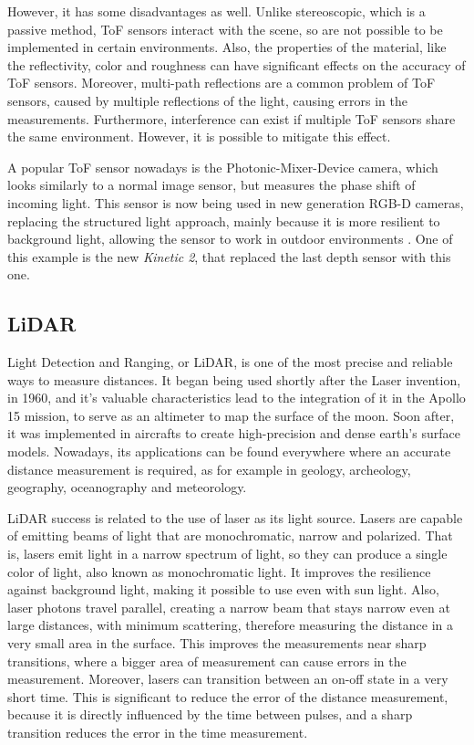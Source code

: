 However, it has some disadvantages as well. Unlike stereoscopic, which is a passive method, ToF sensors interact with the scene, so are not possible to be implemented in certain environments. Also, the properties of the material, like the reflectivity, color and roughness can have significant effects on the accuracy of ToF sensors. Moreover, multi-path reflections are a common problem of ToF sensors, caused by multiple reflections of the light, causing errors in the measurements. Furthermore, interference can exist if multiple ToF sensors share the same environment. However, it is possible to mitigate this effect.

A popular ToF sensor nowadays is the Photonic-Mixer-Device camera, which looks similarly to a normal image sensor, but measures the phase shift of incoming light. This sensor is now being used in new generation RGB-D cameras, replacing the structured light approach, mainly because it is more resilient to background light, allowing the sensor to work in outdoor environments \cite{zollhoefer2018}. One of this example is the new \textit{Kinetic 2}, that replaced the last depth sensor with this one.

\subsection{LiDAR}

Light Detection and Ranging, or LiDAR, is one of the most precise and reliable ways to measure distances. It began being used shortly after the Laser invention, in 1960, and it's valuable characteristics lead to the integration of it in the Apollo 15 mission, to serve as an altimeter to map the surface of the moon. Soon after, it was implemented in aircrafts to create high-precision and dense earth's surface models. Nowadays, its applications can be found everywhere where an accurate distance measurement is required, as for example in geology, archeology, geography, oceanography and meteorology.

LiDAR success is related to the use of laser as its light source. Lasers are capable of emitting beams of light that are monochromatic, narrow and polarized. That is, lasers emit light in a narrow spectrum of light, so they can produce a single color of light, also known as monochromatic light. It improves the resilience against background light, making it possible to use even with sun light. Also, laser photons travel parallel, creating a narrow beam that stays narrow even at large distances, with minimum scattering, therefore measuring the distance in a very small area in the surface. This improves the measurements near sharp transitions, where a bigger area of measurement can cause errors in the measurement. Moreover, lasers can transition between an on-off state in a very short time. This is significant to reduce the error of the distance measurement, because it is directly influenced by the time between pulses, and a sharp transition reduces the error in the time measurement. 

